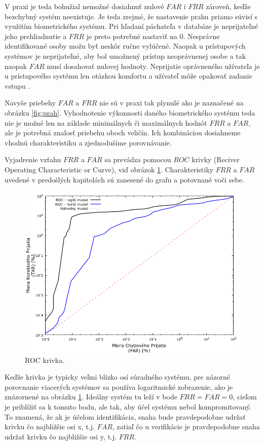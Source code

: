 V praxi je teda bohužial nemožné dosiahnuť nulové $FAR$ i $FRR$ zároveň, keďže bezchybný systém neexistuje. Je teda zrejmé, že nastavenie prahu priamo súvisí s využitím biometrického systému. Pri hľadaní páchateľa v databáze je neprijateľné jeho prehliadnutie a $FRR$ je preto potrebné nastaviť na 0. Nesprávne identifikované osoby možu byť neskôr ručne vylúčené. Naopak u prístupových systémov je neprijateľné, aby bol umožnený prístup neoprávnenej osobe a tak naopak $FAR$ musí dosahovať nulovej hodnoty. Neprijatie oprávneného užívateľa je u prístupového systému len otázkou komfortu a užívateľ môže opakovať zadanie vstupu \cite{bio3}.

Navyše priebehy $FAR$ a $FRR$ nie sú v praxi tak plynulé ako je naznačené na obrázku \ref{fig:prah}. Vyhodnotenie výkonnosti daného biometrického systému teda nie je možné len na základe minimálnych či maximálnych hodnôt $FRR$ a $FAR$, ale je potrebná znalosť priebehu oboch veličín. Ich kombináciou dosiahneme vhodnú charakteristiku a zjednodušíme porovnávanie.

Vyjadrenie vzťahu $FRR$ a $FAR$ sa prevádza pomocou $ROC$ krivky (Reciver Operating Characteristic or Curve), viď obrázok \ref{fig:roc}. Charakteristiky $FRR$ a $FAR$ uvedené v predošlých kapitolách sú zanesené do grafu a potovnané voči sebe.

\begin{figure}[h]
	\centering
	\includegraphics[width=13cm]{img/roc.png}
	\caption{ROC krivka\cite{bio3}.}
	\label{fig:roc}
\end{figure}

Keďže krivka je typicky veľmi blízko osí súradného systému, pre názorné porovnanie viacerých systémov sa používa logaritmické zobrazenie, ako je znázornené na obrázku \ref{fig:roc}. Ideálny systém tu leží v bode $FRR = FAR = 0$, cieľom je priblížiť sa k tomuto bodu, ale tak, aby účel systému nebol kompromitovaný. To znamená, že ak je účelom identifikácia, snaha bude pravdepodobne udržať krivku čo najbližšie osi x, t.j. $FAR$, zatiaľ čo u verifikácie je pravdepodobne snaha udržať krivku čo najbližšie osi y, t.j. $FRR$.

